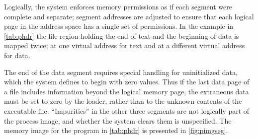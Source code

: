 \documentclass[english,11pt,twoside,toc=bib,toc=idx]{scrreprt}
\begin{document}
Logically, the system enforces memory permissions as if each segment
were complete and separate; segment addresses are adjusted to ensure
that each logical page in the address space has a single set of
permissions.  In the example in \cref{tab:phdr} the file region
holding the end of text and the beginning of data is mapped twice; at
one virtual address for text and at a different virtual address for
data.

The end of the data segment requires special handling for
uninitialized data, which the system defines to begin with zero
values.  Thus if the last data page of a file includes information
beyond the logical memory page, the extraneous data must be set to
zero by the loader, rather than to the unknown contents of the
executable file.  ``Impurities'' in the other three segments are not
logically part of the process image, and whether the system clears
them is unspecified.  The memory image for the program in
\cref{tab:phdr} is presented in \cref{fig:pimgseg}.
\end{document}
